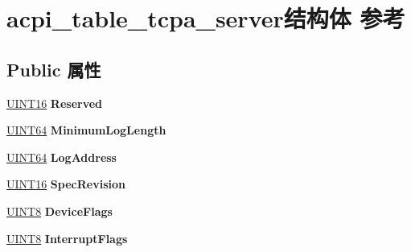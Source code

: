 \hypertarget{structacpi__table__tcpa__server}{}\section{acpi\+\_\+table\+\_\+tcpa\+\_\+server结构体 参考}
\label{structacpi__table__tcpa__server}
\subsection*{Public 属性}
\begin{DoxyCompactItemize}
\item 
\mbox{\label{structacpi__table__tcpa__server_a562acf7a1c317ab7a09cbb760a297fad}} 
\hyperlink{_processor_bind_8h_a09f1a1fb2293e33483cc8d44aefb1eb1}{U\+I\+N\+T16} {\bfseries Reserved}
\item 
\mbox{\label{structacpi__table__tcpa__server_a354105574d869922093fea701f35a24b}} 
\hyperlink{_processor_bind_8h_a57be03562867144161c1bfee95ca8f7c}{U\+I\+N\+T64} {\bfseries Minimum\+Log\+Length}
\item 
\mbox{\label{structacpi__table__tcpa__server_a5430217ac41d1ed07c4a131118fbb032}} 
\hyperlink{_processor_bind_8h_a57be03562867144161c1bfee95ca8f7c}{U\+I\+N\+T64} {\bfseries Log\+Address}
\item 
\mbox{\label{structacpi__table__tcpa__server_aae201499ae0d918885abdc178c64f672}} 
\hyperlink{_processor_bind_8h_a09f1a1fb2293e33483cc8d44aefb1eb1}{U\+I\+N\+T16} {\bfseries Spec\+Revision}
\item 
\mbox{\label{structacpi__table__tcpa__server_a770e5919593a0feaa7e6fdd9ffc776b7}} 
\hyperlink{_processor_bind_8h_ab27e9918b538ce9d8ca692479b375b6a}{U\+I\+N\+T8} {\bfseries Device\+Flags}
\item 
\mbox{\label{structacpi__table__tcpa__server_ab45cd04e13997107ba566cded9967a93}} 
\hyperlink{_processor_bind_8h_ab27e9918b538ce9d8ca692479b375b6a}{U\+I\+N\+T8} {\bfseries Interrupt\+Flags}
\item 
\mbox{\label{structacpi__table__tcpa__server_a508d4ec93b11a535ec3a0a9197c6947b}} 

\end{DoxyCompactItemize}
